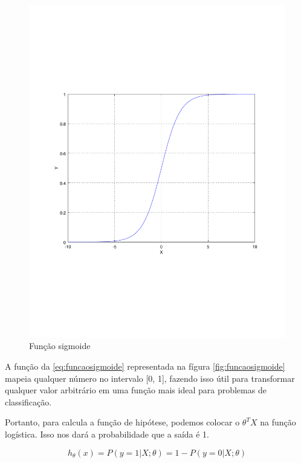 \begin{figure}[htb]
  \caption{Função sigmoide}\label{fig:funcaosigmoide}
  \begin{center}
      \includegraphics[scale=0.75]{img/funcaosigmoide}
  \end{center}
\end{figure}

A função da \autoref{eq:funcaosigmoide} representada na fígura \autoref{fig:funcaosigmoide} mapeia qualquer número no intervalo [0, 1], fazendo isso útil para transformar qualquer valor arbitrário em uma função mais ideal para problemas de classificação.

Portanto, para calcula a função de hipótese, podemos colocar o $\theta^TX$ na função logística. Isso nos dará a probabilidade que a saída é 1.

\begin{equation}
h_{\theta}(x) = P(y=1 | X ; \theta) = 1 - P(y=0 | X ; \theta) \nonumber
\end{equation}

